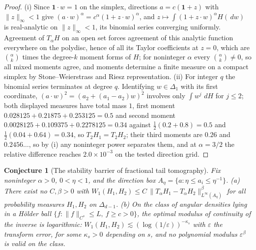 \documentclass[11pt]{article}
\newtheorem{conjecture}{Conjecture}
\theoremstyle{definition}
\newcommand{\eps}{\varepsilon}
\newcommand{\dd}{\,d}
\begin{document}
\begin{proof}
(i) Since $\mathbf 1\cdot w=1$ on the simplex, directions $a=c(\mathbf 1+z)$ with $\lVert z\rVert_\infty<1$ give $(a\cdot w)^\alpha=c^\alpha(1+z\cdot w)^\alpha$, and $z\mapsto\int(1+z\cdot w)^\alpha H(\dd w)$ is real-analytic on $\lVert z\rVert_\infty<1$, its binomial series converging uniformly.  Agreement of $T_\alpha H$ on an open set forces agreement of this analytic function everywhere on the polydisc, hence of all its Taylor coefficients at $z=0$, which are $\binom\alpha k$ times the degree-$k$ moment forms of $H$; for noninteger $\alpha$ every $\binom\alpha k\ne0$, so all mixed moments agree, and moments determine a finite measure on a compact simplex by Stone--Weierstrass and Riesz representation.  (ii) For integer $q$ the binomial series terminates at degree $q$.  Identifying $w\in\Delta_1$ with its first coordinate, $(a\cdot w)^2=(a_2+(a_1-a_2)w)^2$ involves only $\int w^j\,\dd H$ for $j\le2$; both displayed measures have total mass $1$, first moment $0.028125+0.21875+0.253125=0.5$ and second moment $0.0028125+0.109375+0.2278125=0.34$ against $\tfrac12(0.2+0.8)=0.5$ and $\tfrac12(0.04+0.64)=0.34$, so $T_2H_1=T_2H_2$; their third moments are $0.26$ and $0.2456\ldots$, so by (i) any noninteger power separates them, and at $\alpha=3/2$ the relative difference reaches $2.0\times10^{-3}$ on the tested direction grid.
\end{proof}

\begin{conjecture}[The stability barrier of fractional tail tomography]\label{ah9}
Fix noninteger $\alpha>0$, $0<\eta<1$, and the direction box $A_\eta=\{a:\eta\le a_i\le\eta^{-1}\}$.  (a) There exist no $C,\beta>0$ with $W_1(H_1,H_2)\le C\,\lVert T_\alpha H_1-T_\alpha H_2\rVert_{L^\infty(A_\eta)}^\beta$ for all probability measures $H_1,H_2$ on $\Delta_{d-1}$.  (b) On the class of angular densities lying in a H\"older ball $\{f:\lVert f\rVert_{C^s}\le L,\ f\ge c>0\}$, the optimal modulus of continuity of the inverse is logarithmic: $W_1(H_1,H_2)\lesssim(\log(1/\eps))^{-\kappa_s}$ with $\eps$ the transform error, for some $\kappa_s>0$ depending on $s$, and no polynomial modulus $\eps^\beta$ is valid on the class.
\end{conjecture}
\end{document}
